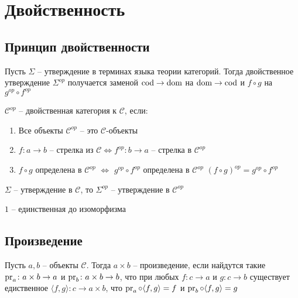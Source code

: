 \section{Двойственность}
\subsection{Принцип двойственности}
\begin{defn}
  Пусть $\Sigma$ -- утверждение в терминах языка теории категорий.
  Тогда двойственное утверждение $\Sigma^{op}$ получается заменой
  $\operatorname{cod} \to \operatorname{dom}$ на $\operatorname{dom} \to \operatorname{cod}$ и $f \circ g$ на $g^{op} \circ f^{op}$
\end{defn}

\begin{defn}
  $\mathcal{C}^{op}$ -- двойственная категория к $\mathcal{C}$, если:
  \begin{enumerate}
    \item Все объекты $\mathcal{C}^{op}$ -- это $\mathcal{C}$-объекты
    \item $f \colon a \to b$ -- стрелка из $\mathcal{C} \iff f^{op}
      \colon b \to a$ -- стрелка в $\mathcal{C}^{op}$
    \item $f \circ g$ определена в $\mathcal{C}^{op}$ $\iff$ $g^{op} \circ
      f^{op}$ определена в $\mathcal{C}^{op}$
      $(f \circ g)^{op} = g^{op} \circ f^{op}$
  \end{enumerate}
\end{defn}

\begin{task}
  $\Sigma$ -- утверждение в $\mathcal{C}$, то $\Sigma^{op}$ -- утверждение в $\mathcal{C}^{op}$
\end{task}

\begin{task}
  $1$ -- единственная до изоморфизма
\end{task}

\subsection{Произведение}
\begin{defn}
  Пусть $a, b$ -- объекты $\mathcal{C}$. Тогда $a \times b$ -- произведение, если
  найдутся такие $\operatorname{pr}_a \colon a \times b \to a$ и $\operatorname{pr}_b \colon a \times b \to b$,
  что при любых $f \colon c \to a$ и $g \colon c \to b$ существует едиственное
  $\langle f, g \rangle \colon c \to a \times b$, что
  $\operatorname{pr}_a \circ \langle f, g \rangle = f$ и $\operatorname{pr}_b \circ \langle f, g \rangle = g$
\end{defn}

